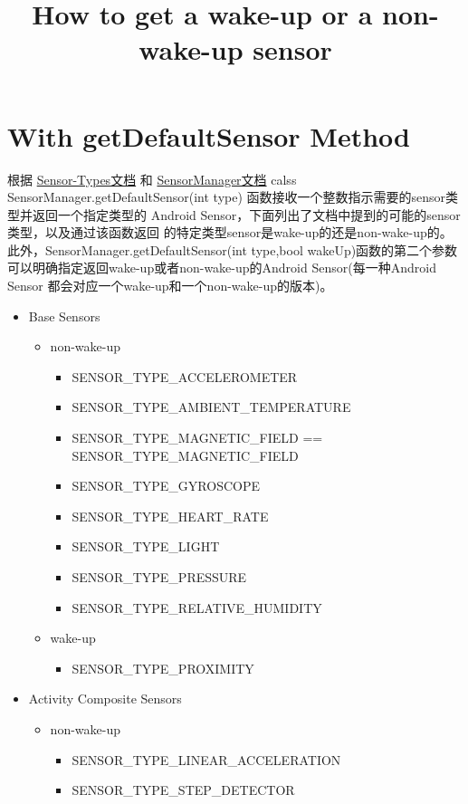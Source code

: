 \documentclass{article}
\title{How to get a wake-up or a non-wake-up sensor}
\begin{document}
\section{With getDefaultSensor Method}
根据
\href{https://source.android.com/devices/sensors/sensor-types.html}
     {Sensor-Types文档}
和
\href{https://developer.android.com/reference/android/hardware/SensorManager.html}{SensorManager文档}
calss SensorManager.getDefaultSensor(int type)
函数接收一个整数指示需要的sensor类型并返回一个指定类型的
Android Sensor，下面列出了文档中提到的可能的sensor类型，以及通过该函数返回
的特定类型sensor是wake-up的还是non-wake-up的。
此外，SensorManager.getDefaultSensor(int type,bool wakeUp)函数的第二个参数
可以明确指定返回wake-up或者non-wake-up的Android Sensor(每一种Android Sensor
都会对应一个wake-up和一个non-wake-up的版本)。
\begin{itemize}
  \item Base Sensors
    \begin{itemize}
    \item non-wake-up
      \begin{itemize}
        \item SENSOR\_TYPE\_ACCELEROMETER
        \item SENSOR\_TYPE\_AMBIENT\_TEMPERATURE
        \item SENSOR\_TYPE\_MAGNETIC\_FIELD == SENSOR\_TYPE\_MAGNETIC\_FIELD
        \item SENSOR\_TYPE\_GYROSCOPE
        \item SENSOR\_TYPE\_HEART\_RATE
        \item SENSOR\_TYPE\_LIGHT
        \item SENSOR\_TYPE\_PRESSURE
        \item SENSOR\_TYPE\_RELATIVE\_HUMIDITY
      \end{itemize}
    \item wake-up
      \begin{itemize}
        \item SENSOR\_TYPE\_PROXIMITY
      \end{itemize}
    \end{itemize}
  \item Activity Composite Sensors
    \begin{itemize}
    \item non-wake-up
      \begin{itemize}
      \item SENSOR\_TYPE\_LINEAR\_ACCELERATION
      \item SENSOR\_TYPE\_STEP\_DETECTOR

\end{itemize}
\end{itemize}
\end{itemize}
\end{document}

